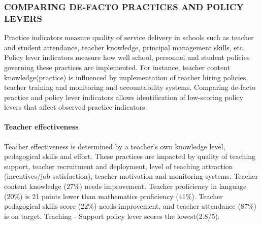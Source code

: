 \documentclass[twocolumn]{article}
\let\oldparagraph\paragraph
\renewcommand{\paragraph}[1]{\oldparagraph{#1}\mbox{}}
\begin{document}
\hypertarget{comparing-de-facto-practices-and-policy-levers}{%
\subsubsection{\texorpdfstring{\textbf{COMPARING DE-FACTO PRACTICES AND
POLICY
LEVERS}}{COMPARING DE-FACTO PRACTICES AND POLICY LEVERS}}\label{comparing-de-facto-practices-and-policy-levers}}

Practice indicators measure quality of service delivery in schools such
as teacher and student attendance, teacher knowledge, principal
management skills, etc. Policy lever indicators measure how well school,
personnel and student policies governing these practices are
implemented. For instance, teacher content knowledge(practice) is
influenced by implementation of teacher hiring policies, teacher
training and monitoring and accountability systems. Comparing de-facto
practice and policy lever indicators allows identification of
low-scoring policy levers that affect observed practice indicators.

\hypertarget{teacher-effectiveness}{%
\paragraph{\texorpdfstring{\textbf{Teacher
effectiveness}}{Teacher effectiveness}}\label{teacher-effectiveness}}

Teacher effectiveness is determined by a teacher's own knowledge level,
pedagogical skills and effort. These practices are impacted by quality
of teaching support, teacher recruitment and deployment, level of
teaching attraction (incentives/job satisfaction), teacher motivation
and monitoring systems. Teacher content knowledge (27\%) needs
improvement. Teacher proficiency in language (20\%) is 21 points lower
than mathematics proficiency (41\%). Teacher pedagogical skills score
(22\%) needs improvement, and teacher attendance (87\%) is on target.
Teaching - Support policy lever scores the lowest(2.8/5).
\end{document}
